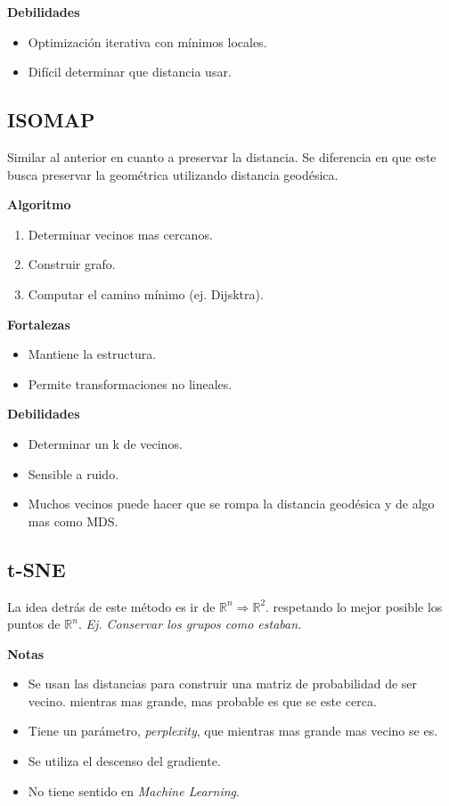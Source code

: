 \documentclass[titlepage,a4paper]{article}
\begin{document}
\textbf{Debilidades}
\begin{itemize}
    \item Optimización iterativa con mínimos locales.
    \item Difícil determinar que distancia usar.
\end{itemize}


\subsection{ISOMAP}

Similar al anterior en cuanto a preservar la distancia. Se diferencia en que este busca preservar la geométrica utilizando distancia geodésica.

\textbf{Algoritmo}
\begin{enumerate}
    \item Determinar vecinos mas cercanos.
    \item Construir grafo.
    \item Computar el camino mínimo (ej. Dijsktra).
\end{enumerate}

\textbf{Fortalezas}
\begin{itemize}
    \item Mantiene la estructura.
    \item Permite transformaciones no lineales.
\end{itemize}

\textbf{Debilidades}
\begin{itemize}
    \item Determinar un k de vecinos.
    \item Sensible a ruido.
    \item Muchos vecinos puede hacer que se rompa la distancia geodésica y de algo mas como MDS.
\end{itemize}


\subsection{t-SNE}

La idea detrás de este método es ir de $\mathbb{R}^{n} \Rightarrow \mathbb{R}^{2}$. respetando lo mejor posible los puntos de $\mathbb{R}^{n}$. \textit{Ej. Conservar los grupos como estaban.}

\textbf{Notas}
\begin{itemize}
    \item Se usan las distancias para construir una matriz de probabilidad de ser vecino. mientras mas grande, mas probable es que se este cerca.

    \item Tiene un parámetro, \textit{perplexity}, que mientras mas grande mas vecino se es.
    
    \item Se utiliza el descenso del gradiente.
    
    \item No tiene sentido en \textit{Machine Learning}.
\end{itemize}
\end{document}
